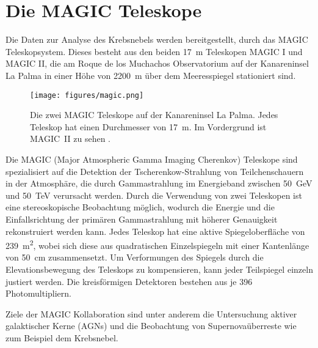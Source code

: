 \section{Die MAGIC Teleskope}
\label{sec:teleskop}

Die Daten zur Analyse des Krebsnebels werden bereitgestellt, durch das MAGIC
Teleskopsystem. Dieses besteht aus den beiden \SI{17}{\metre} Teleskopen MAGIC I
und MAGIC II, die am Roque de los Muchachos Observatorium auf der Kanareninsel
La Palma in einer Höhe von \SI{2200}{\metre} über dem Meeresspiegel stationiert
sind.

\begin{figure}
  \centering
  \texttt{[image: figures/magic.png]}
  \caption{Die zwei MAGIC Teleskope auf der Kanareninsel La Palma. Jedes
  Teleskop hat einen Durchmesser von \SI{17}{\metre}. Im Vordergrund ist
  MAGIC~II zu sehen \cite{magic}.} %
  \label{fig:telescope}
\end{figure}

Die MAGIC (Major Atmospheric Gamma Imaging Cherenkov) Teleskope sind
spezialisiert auf die Detektion der Tscherenkow-Strahlung von Teilchenschauern
in der Atmosphäre, die durch Gammastrahlung im Energieband zwischen
\SI{50}{\giga\electronvolt} und \SI{50}{\tera\electronvolt} verursacht werden.
Durch die Verwendung von zwei Teleskopen ist eine stereoskopische Beobachtung
möglich, wodurch die Energie und die Einfallsrichtung der primären
Gammastrahlung mit höherer Genauigkeit rekonstruiert werden kann. Jedes Teleskop
hat eine aktive Spiegeloberfläche von \SI{239}{\metre\squared}, wobei sich diese
aus quadratischen Einzelspiegeln mit einer Kantenlänge von \SI{50}{\centi\metre}
zusammensetzt. Um Verformungen des Spiegels durch die Elevationsbewegung des
Teleskops zu kompensieren, kann jeder Teilspiegel einzeln justiert werden. Die
kreisförmigen Detektoren bestehen aus je 396 Photomultipliern.

Ziele der MAGIC Kollaboration sind unter anderem die Untersuchung aktiver
galaktischer Kerne (AGNs) und die Beobachtung von Supernovaüberreste wie zum
Beispiel dem Krebsnebel.
